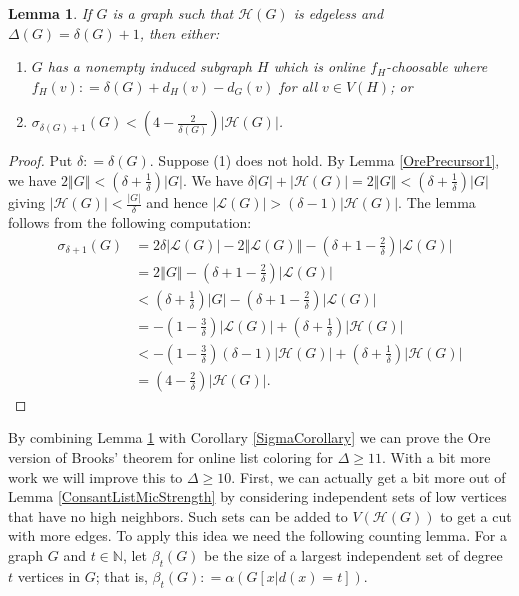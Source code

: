\documentclass[12pt]{article}
\theoremstyle{plain}
\newtheorem{lem}[thm]{Lemma}
\theoremstyle{definition}
\theoremstyle{remark}
\newcommand{\fancy}[1]{\mathcal{#1}}
\newcommand{\IN}{\mathbb{N}}
\renewcommand{\L}{\fancy{L}}
\newcommand{\HH}{\fancy{H}}
\newcommand{\card}[1]{\left|#1\right|}
\newcommand{\size}[1]{\left\Vert#1\right\Vert}
\newcommand{\parens}[1]{\left( #1 \right)}
\newcommand{\DefinedAs}{\mathrel{\mathop:}=}
\begin{document}
\begin{lem}\label{OrePrecursor2}
If $G$ is a graph such that $\HH(G)$ is edgeless and $\Delta(G) = \delta(G) + 1$, then either:
\begin{enumerate}
\item $G$ has a nonempty induced subgraph $H$ which is online $f_H$-choosable where $f_H(v) \DefinedAs \delta(G) + d_H(v) - d_G(v)$ for all $v \in V(H)$; or
\item $\sigma_{\delta(G) + 1}(G) < \parens{4 - \frac{2}{\delta(G)}}\card{\HH(G)}$.
\end{enumerate}
\end{lem}
\begin{proof}
Put $\delta \DefinedAs \delta(G)$. Suppose (1) does not hold.  By Lemma \ref{OrePrecursor1}, we have $2\size{G} < \parens{\delta + \frac{1}{\delta}}\card{G}$.  
We have $\delta \card{G} + \card{\HH(G)} = 2\size{G} < \parens{\delta + \frac{1}{\delta}}\card{G}$ giving $\card{\HH(G)} < \frac{\card{G}}{\delta}$ and hence $\card{\L(G)} > (\delta-1)\card{\HH(G)}$.
The lemma follows from the following computation:
\begin{align*}
\sigma_{\delta+1}(G) &= 2\delta\card{\L(G)} - 2\size{\L(G)} - \parens{\delta + 1 -\frac{2}{\delta}}\card{\L(G)}\\
&=2\size{G} - \parens{\delta + 1 -\frac{2}{\delta}}\card{\L(G)}\\
&<\parens{\delta + \frac{1}{\delta}}\card{G} - \parens{\delta + 1 -\frac{2}{\delta}}\card{\L(G)}\\
&=-\parens{1 - \frac{3}{\delta}}\card{\L(G)} + \parens{\delta + \frac{1}{\delta}}\card{\HH(G)} \\
&<-\parens{1 - \frac{3}{\delta}}(\delta-1)\card{\HH(G)} + \parens{\delta + \frac{1}{\delta}}\card{\HH(G)} \\
&=\parens{4 - \frac{2}{\delta}}\card{\HH(G)}.
\end{align*}
\end{proof}

By combining Lemma \ref{OrePrecursor2} with Corollary \ref{SigmaCorollary} we can prove the Ore version of Brooks' theorem for online list coloring for $\Delta \geq 11$.  With a bit more work we will improve this to $\Delta \geq 10$.  First, we can actually get a bit more out of Lemma \ref{ConsantListMicStrength} by considering independent sets of low vertices that have no high neighbors.  Such sets can be added to $V(\HH(G))$ to get a cut with more edges.  To apply this idea we need the following counting lemma.  For a graph $G$ and $t \in \IN$, let $\beta_t(G)$ be the size of a largest independent set of degree $t$ vertices in $G$; that is, $\beta_t(G) \DefinedAs \alpha(G[x|d(x) = t])$. 
\end{document}
